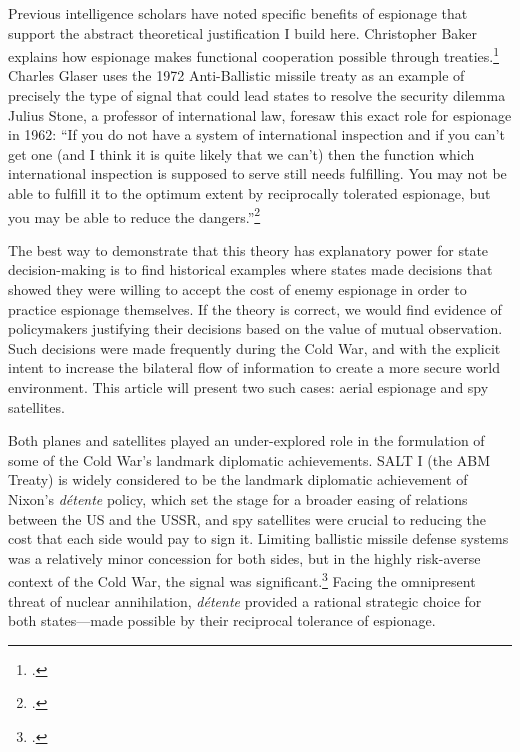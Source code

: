 \documentclass[14pt]{extarticle}
\begin{document}
Previous intelligence scholars have noted specific benefits of espionage that support the abstract theoretical justification I build here. Christopher Baker explains how espionage makes functional cooperation possible through treaties.\footcite[p.~6]{baker_tolerance_2004} Charles Glaser uses the 1972 Anti-Ballistic missile treaty as an example of precisely the type of signal that could lead states to resolve the security dilemma Julius Stone, a professor of international law, foresaw this exact role for espionage in 1962: \enquote{If you do not have a system of international inspection and if you can't get one (and I think it is quite likely that we can't) then the function which international inspection is supposed to serve still needs fulfilling. You may not be able to fulfill it to the optimum extent by reciprocally tolerated espionage, but you may be able to reduce the dangers.}\footcite[p.~41]{stone_legal_1962}

The best way to demonstrate that this theory has explanatory power for state decision-making is to find historical examples where states made decisions that showed they were willing to accept the cost of enemy espionage in order to practice espionage themselves. If the theory is correct, we would find evidence of policymakers justifying their decisions based on the value of mutual observation. Such decisions were made frequently during the Cold War, and with the explicit intent to increase the bilateral flow of information to create a more secure world environment. This article will present two such cases: aerial espionage and spy satellites.

Both planes and satellites played an under-explored role in the formulation of some of the Cold War's landmark diplomatic achievements. SALT I (the ABM Treaty) is widely considered to be the landmark diplomatic achievement of Nixon's \emph{d\'etente} policy, which set the stage for a broader easing of relations between the US and the USSR, and spy satellites were crucial to reducing the cost that each side would pay to sign it. Limiting ballistic missile defense systems was a relatively minor concession for both sides, but in the highly risk-averse context of the Cold War, the signal was significant.\footcite[p.~66]{glaser_rational_2010} Facing the omnipresent threat of nuclear annihilation, \emph{d\'etente} provided a rational strategic choice for both states---made possible by their reciprocal tolerance of espionage.

\end{document}
